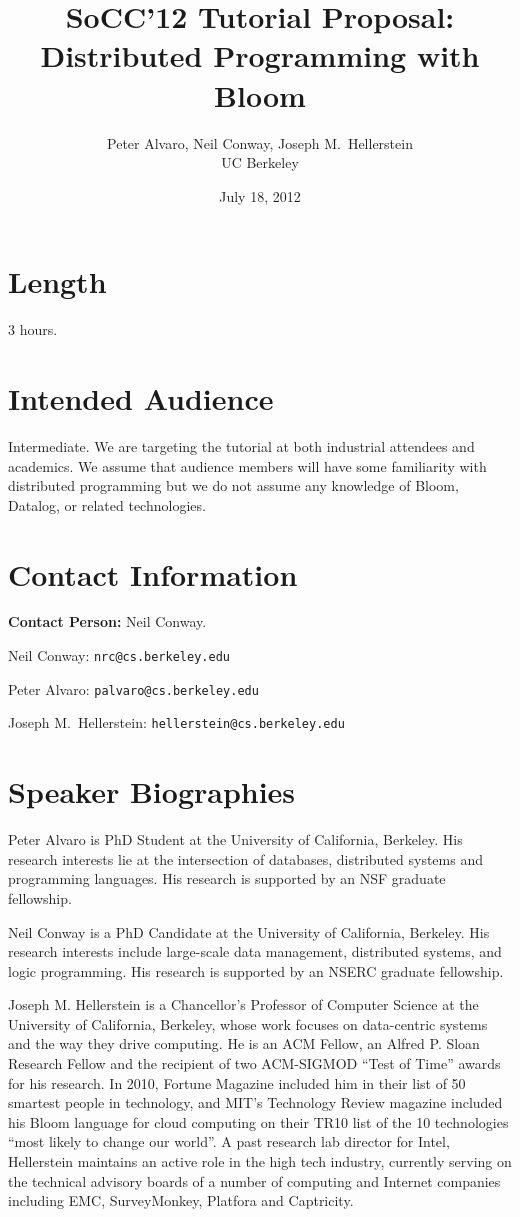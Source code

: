 \documentclass[11pt]{article}
\title{SoCC'12 Tutorial Proposal:\\Distributed Programming with Bloom}
\author{Peter Alvaro, Neil Conway, Joseph M.\ Hellerstein\\UC Berkeley}
\date{July 18, 2012}
\begin{document}
\maketitle

\section*{Length}

3 hours.

\section*{Intended Audience}

Intermediate. We are targeting the tutorial at both industrial attendees and
academics. We assume that audience members will have some familiarity with
distributed programming but we do not assume any knowledge of Bloom, Datalog, or
related technologies.

\section*{Contact Information}

\textbf{Contact Person:} Neil Conway.

\bigskip

\noindent{}Neil Conway: \texttt{nrc@cs.berkeley.edu}

\noindent{}Peter Alvaro: \texttt{palvaro@cs.berkeley.edu}

\noindent{}Joseph M.\ Hellerstein: \texttt{hellerstein@cs.berkeley.edu}

\section*{Speaker Biographies}

Peter Alvaro is PhD Student at the University of California, Berkeley. His
research interests lie at the intersection of databases, distributed systems and
programming languages. His research is supported by an NSF graduate fellowship.

Neil Conway is a PhD Candidate at the University of California, Berkeley. His
research interests include large-scale data management, distributed systems,
and logic programming. His research is supported by an NSERC graduate
fellowship.

Joseph M. Hellerstein is a Chancellor's Professor of Computer Science at the
University of California, Berkeley, whose work focuses on data-centric systems
and the way they drive computing. He is an ACM Fellow, an Alfred P. Sloan
Research Fellow and the recipient of two ACM-SIGMOD ``Test of Time'' awards for
his research. In 2010, Fortune Magazine included him in their list of 50
smartest people in technology, and MIT's Technology Review magazine included his
Bloom language for cloud computing on their TR10 list of the 10 technologies
``most likely to change our world''. A past research lab director for Intel,
Hellerstein maintains an active role in the high tech industry, currently
serving on the technical advisory boards of a number of computing and Internet
companies including EMC, SurveyMonkey, Platfora and Captricity.
\end{document}
